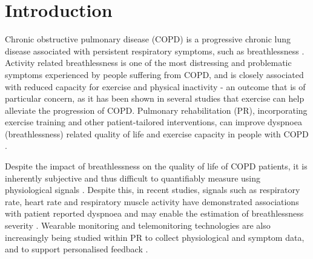 \section{Introduction}
Chronic obstructive pulmonary disease (COPD) is a progressive chronic lung disease associated with persistent respiratory symptoms, such as breathlessness \cite{mccarthyPulmonaryRehabilitationChronic2015}. Activity related breathlessness is one of the most distressing and problematic symptoms experienced by people suffering from COPD, and is closely associated with reduced capacity for exercise and physical inactivity \cite{lewthwaiteHowAssessBreathlessness2021, odonnellExertionalDyspnoeaCOPD2016} - an outcome that is of particular concern, as it has been shown in several studies that exercise can help alleviate the progression of COPD. %
Pulmonary rehabilitation (PR), incorporating exercise training and other patient-tailored interventions, can improve dyspnoea (breathlessness) related quality of life and exercise capacity in people with COPD \cite{mccarthyPulmonaryRehabilitationChronic2015}.

Despite the impact of breathlessness on the quality of life of COPD patients, it is inherently subjective and thus difficult to quantifiably measure using physiological signals \cite{lewthwaiteHowAssessBreathlessness2021, odonnellExertionalDyspnoeaCOPD2016}. Despite this, in recent studies, signals such as respiratory rate, heart rate and respiratory muscle activity have demonstrated associations with patient reported dyspnoea and may enable the estimation of breathlessness severity \cite{dorssersDyspneaRespiratoryEMG2026}. Wearable monitoring and telemonitoring technologies are also increasingly being studied within PR to collect physiological and symptom data, and to support personalised feedback \cite{otto-yanezPulmonaryTelerehabilitationTelemonitoring2026}.